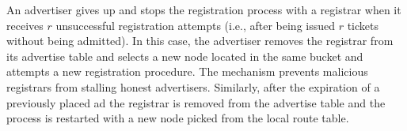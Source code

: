 An advertiser gives up and stops the registration process with a registrar when it receives $r$ unsuccessful registration attempts (i.e., after being issued $r$ tickets without being admitted). In this case, the advertiser removes the registrar from its advertise table and selects a new node located in the same bucket and attempts a new registration procedure. The mechanism prevents malicious registrars from stalling honest advertisers.
Similarly, after the expiration of a previously placed ad the registrar is removed from the advertise table and the process is restarted with a new node picked from the local route table.%
